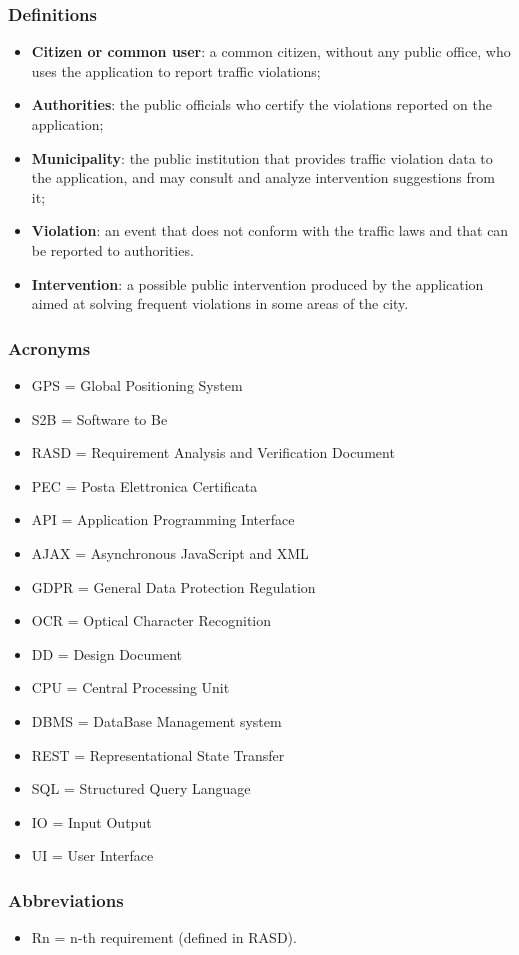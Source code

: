 \subsubsection{Definitions}
\begin{itemize}
	\item \textbf{Citizen or common user}: a common citizen, without any public office, who uses the application to report traffic violations;
	\item \textbf{Authorities}: the public officials who certify the violations reported on the application;
	\item \textbf{Municipality}: the public institution that provides traffic violation data to the application, and may consult and analyze intervention suggestions from it;
	\item \textbf{Violation}: an event that does not conform with the traffic laws and that can be reported to authorities.
	\item \textbf{Intervention}: a possible public intervention produced by the application aimed at solving frequent violations in some areas of the city.
\end{itemize}
\subsubsection{Acronyms}
\begin{itemize}
	\item GPS = Global Positioning System
	\item S2B = Software to Be
	\item RASD = Requirement Analysis and Verification Document
	\item PEC = Posta Elettronica Certificata
	\item API = Application Programming Interface
	\item AJAX = Asynchronous JavaScript and XML
	\item GDPR = General Data Protection Regulation
	\item OCR = Optical Character Recognition
	\item DD = Design Document
	\item CPU = Central Processing Unit
	\item DBMS = DataBase Management system
	\item REST = Representational State Transfer
	\item SQL = Structured Query Language
	\item IO = Input Output
	\item UI = User Interface
\end{itemize}
\subsubsection{Abbreviations}
\begin{itemize}
	\item Rn = n-th requirement (defined in RASD).
\end{itemize}